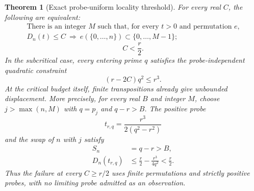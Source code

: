 \documentclass[11pt]{article}
\newtheorem{theorem}{Theorem}[section]
\theoremstyle{definition}
\begin{document}
\begin{theorem}[Exact probe-uniform locality threshold]
For every real $C$, the following are equivalent:
\[
 \begin{gathered}
 \text{There is an integer $M$ such that, for every $t>0$ and permutation $e$,}\\
 D_n(t)\le C\ \Longrightarrow\
 e(\{0,\ldots,n\})\subset\{0,\ldots,M-1\};
 \end{gathered}
\]
\[
 C<\frac r2.
\]
In the subcritical case, every entering prime $q$ satisfies the
probe-independent quadratic constraint
\[
 (r-2C)q^2\le r^3.
\]
At the critical budget itself, finite transpositions already
give unbounded displacement. More precisely, for every real $B$
and integer $M$, choose $j>\max(n,M)$ with $q=p_j$ and
$q-r>B$. The positive probe
\[
 t_{r,q}=\frac{r^3}{2(q^2-r^2)}
\]
and the swap of $n$ with $j$ satisfy
\[
 \begin{split}
 S_n&=q-r>B,\\
 D_n(t_{r,q})&\le\frac r2-\frac{r^3}{4q^2}<\frac r2.
 \end{split}
\]
Thus the failure at every $C\ge r/2$ uses finite permutations
and strictly positive probes, with no limiting probe admitted
as an observation.
\end{theorem}
\end{document}
